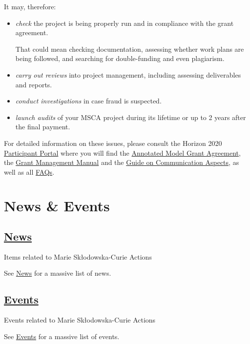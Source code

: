 \documentclass[oneside]{book}
\numberwithin{equation}{section}
\begin{document}
It may, therefore:
\begin{itemize}
    \item \textit{check} the project is being properly run and in compliance with the grant agreement.
    
    That could mean checking documentation, assessing whether work plans are being followed, and searching for double-funding and even plagiarism.
    \item \textit{carry out reviews} into project management, including assessing deliverables and reports.
    \item \textit{conduct investigations} in case fraud is suspected.
    \item \textit{launch audits} of your MSCA project during its lifetime or up to 2 years after the final payment.
\end{itemize}
For detailed information on these issues, please consult the Horizon 2020 \href{http://ec.europa.eu/research/participants/portal/desktop/en/home.html}{Participant Portal} where you will find the \href{http://ec.europa.eu/research/participants/data/ref/h2020/grants_manual/amga/h2020-amga_en.pdf}{Annotated Model Grant Agreement}, the \href{http://ec.europa.eu/research/participants/docs/h2020-funding-guide/grants/grant-management_en.htm}{Grant Management Manual} and the \href{http://ec.europa.eu/research/participants/data/ref/h2020/other/gm/h2020-guide-comm_en.pdf}{Guide on Communication Aspects}, as well as all \href{http://ec.europa.eu/research/participants/portal/desktop/en/support/faq.html#c,faqs=categoryMachineName/t/pp_roles_and_rights/0/1/1/category&tagList/t/MSCA/1/1/1/tag}{FAQs}.

\section{News \& Events}

\subsection{\href{https://ec.europa.eu/research/mariecurieactions/news_en}{News}}
\begin{center}
    Items related to Marie Skłodowska-Curie Actions
\end{center}
See \href{https://ec.europa.eu/research/mariecurieactions/news_en}{News} for a massive list of news.

\subsection{\href{https://ec.europa.eu/research/mariecurieactions/events_en}{Events}}
\begin{center}
    Events related to Marie Skłodowska-Curie Actions
\end{center}
See \href{https://ec.europa.eu/research/mariecurieactions/events_en}{Events} for a massive list of events.
\end{document}
